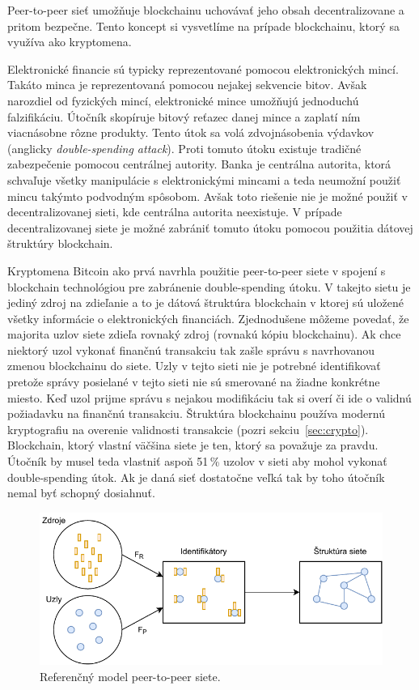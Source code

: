Peer-to-peer sieť umožňuje blockchainu uchovávať jeho obsah decentralizovane a pritom bezpečne. Tento koncept si vysvetlíme na prípade blockchainu, ktorý sa využíva ako kryptomena.

Elektronické financie sú typicky reprezentované pomocou elektronických mincí. Takáto minca je reprezentovaná pomocou nejakej sekvencie bitov. Avšak narozdiel od fyzických mincí, elektronické mince umožňujú jednoduchú falzifikáciu. Útočník skopíruje bitový reťazec danej mince a zaplatí ním viacnásobne rôzne produkty. Tento útok sa volá zdvojnásobenia výdavkov (anglicky \textit{double-spending attack}). Proti tomuto útoku existuje tradičné zabezpečenie pomocou centrálnej autority. Banka je centrálna autorita, ktorá schvaľuje všetky manipulácie s elektronickými mincami a teda neumožní použiť mincu takýmto podvodným spôsobom. Avšak toto riešenie nie je možné použiť v decentralizovanej sieti, kde centrálna autorita neexistuje. V prípade decentralizovanej siete je možné zabrániť tomuto útoku pomocou použitia dátovej štruktúry blockchain.~\cite{doubleSpending}

Kryptomena Bitcoin ako prvá navrhla použitie peer-to-peer siete v spojení s blockchain technológiou pre zabránenie double-spending útoku. V takejto sietu je jediný zdroj na zdieľanie a to je dátová štruktúra blockchain v ktorej sú uložené všetky informácie o elektronických financiách. Zjednodušene môžeme povedať, že majorita uzlov siete zdieľa rovnaký zdroj (rovnakú kópiu blockchainu). Ak chce niektorý uzol vykonať finančnú transakciu tak zašle správu s navrhovanou zmenou blockchainu do siete. Uzly v tejto sieti nie je potrebné identifikovať pretože správy posielané v tejto sieti nie sú smerované na žiadne konkrétne miesto. Keď uzol prijme správu s nejakou modifikáciu tak si overí či ide o validnú požiadavku na finančnú transakciu. Štruktúra blockchainu používa modernú kryptografiu na overenie validnosti transakcie (pozri sekciu~\ref{sec:crypto}). Blockchain, ktorý vlastní väčšina siete je ten, ktorý sa považuje za pravdu. Útočník by musel teda vlastniť aspoň 51\,\% uzolov v sieti aby mohol vykonať double-spending útok. Ak je daná sieť dostatočne veľká tak by toho útočník nemal byť schopný dosiahnuť.~\cite{satoshiBitcoin}

\begin{figure}[bt]
	\centering
	\includegraphics[width=\textwidth]{obrazky-figures/p2p-ref-model.pdf}
	\caption{Referenčný model peer-to-peer siete.~\cite{p2pEssence}}
	\label{img:p2p-ref-model}
\end{figure}


